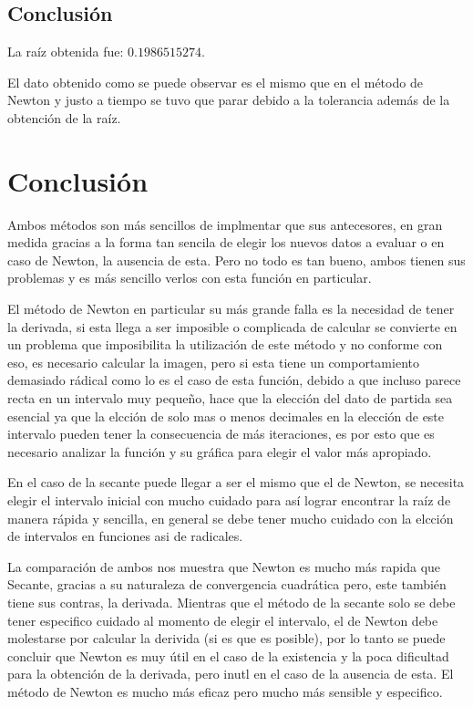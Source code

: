 \documentclass{article}
\begin{document}
\subsection*{Conclusión}
La raíz obtenida fue: $0.1986515274$.

El dato obtenido como se puede observar es el mismo que en el método de Newton y justo a tiempo se tuvo que parar debido a 
la tolerancia además de la obtención de la raíz.

\section{Conclusión}
Ambos métodos son más sencillos de implmentar que sus antecesores, en gran medida gracias a la forma tan sencila de elegir 
los nuevos datos a evaluar o en caso de Newton, la ausencia de esta. 
Pero no todo es tan bueno, ambos tienen sus problemas y es más sencillo verlos con esta función en particular. 

El método de Newton en particular su más grande falla es la necesidad de tener la derivada, si esta llega a ser imposible o 
complicada de calcular se convierte en un problema que imposibilita la utilización de este método y no conforme con eso, es 
necesario calcular la imagen, pero si esta tiene un comportamiento demasiado rádical como lo es el caso de esta función, 
debido a que incluso parece recta en un intervalo muy pequeño, hace que la elección del dato de partida sea esencial ya que 
la elcción de solo mas o menos decimales en la elección de este intervalo pueden tener la consecuencia de más iteraciones, 
es por esto que es necesario analizar la función y su gráfica para elegir el valor más apropiado.

En el caso de la secante puede llegar a ser el mismo que el de Newton, se necesita elegir el intervalo inicial con mucho 
cuidado para así lograr encontrar la raíz de manera rápida y sencilla, en general se debe tener mucho cuidado con la elcción 
de intervalos en funciones asi de radicales. 

La comparación de ambos nos muestra que Newton es mucho más rapida que Secante, gracias a su naturaleza de convergencia cuadrática 
pero, este también tiene sus contras, la derivada. Mientras que el método de la secante solo se debe tener especifico cuidado al 
momento de elegir el intervalo, el de Newton debe molestarse por calcular la derivida (si es que es posible), por lo tanto se puede 
concluir que Newton es muy útil en el caso de la existencia y la poca dificultad para la obtención de la derivada, pero inutl en el 
caso de la ausencia de esta. El método de Newton es mucho más eficaz pero mucho más sensible y especifico.
\end{document}
